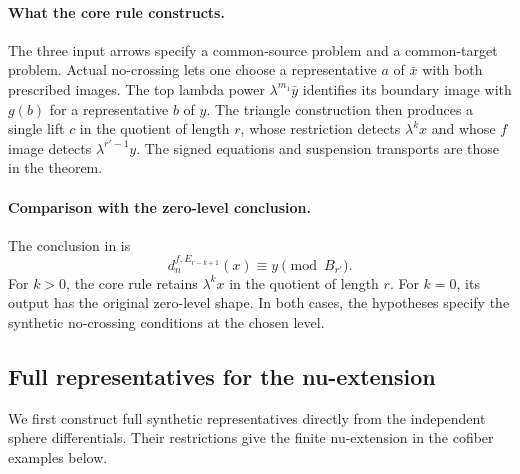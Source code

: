 \paragraph{What the core rule constructs.}
The three input arrows specify a common-source problem and a common-target
problem. Actual no-crossing lets one choose a representative $a$ of
$\bar x$ with both prescribed images. The top lambda power
$\lambda^{m_1}\bar y$ identifies its boundary image with $g(b)$ for a
representative $b$ of $y$. The triangle construction then produces a
single lift $c$ in the quotient of length $r$, whose restriction detects
$\lambda^kx$ and whose $f$ image detects $\lambda^{r'-1}y$.
The signed equations and suspension transports are those in the theorem.

\paragraph{Comparison with the zero-level conclusion.}
The conclusion in \cite[Theorem 6.12]{LWX126} is
\[
d_n^{f,E_{r-k+1}}(x)\equiv y\pmod{B_{r'}}.
\]
For $k>0$, the core rule retains $\lambda^kx$ in the quotient of length $r$.
For $k=0$, its output has the original zero-level shape. In both cases,
the hypotheses specify the synthetic no-crossing conditions at the chosen level.




\subsection{Full representatives for the nu-extension}

We first construct full synthetic representatives directly from the
independent sphere differentials. Their restrictions give the finite
nu-extension in the cofiber examples below.

